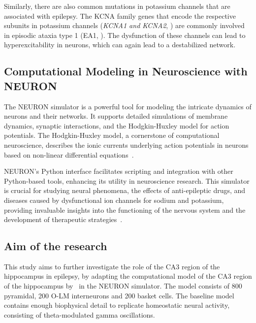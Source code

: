 Similarly, there are also common mutations in potassium channels that are associated with epilepsy.
The KCNA family genes that encode the respective subunits in potassium channels (\textit{KCNA1 and KCNA2}, \textcite{gaoPotassiumChannelsEpilepsy2022})
are commonly involved in episodic ataxia type 1 (EA1, \textcite{gravesIonChannelsEpilepsy2006}).
The dysfunction of these channels can lead to hyperexcitability in neurons, which can again lead to a destabilized network.

 
\subsection{Computational Modeling in Neuroscience with NEURON}
The NEURON simulator is a powerful tool for modeling the intricate dynamics 
of neurons and their networks. It supports detailed simulations of membrane 
dynamics, synaptic interactions, and the Hodgkin-Huxley model for action 
potentials. The Hodgkin-Huxley model, a cornerstone of computational neuroscience,
describes the ionic currents underlying action potentials in neurons based
on non-linear differential equations~\parencite{hodgkinMeasurementCurrentvoltageRelations1952}.

NEURON's Python interface facilitates scripting and integration 
with other Python-based tools, enhancing its utility in neuroscience research.
This simulator is crucial for studying neural phenomena, the effects of 
anti-epileptic drugs, and diseases caused by dysfunctional ion channels for sodium and potassium, 
providing invaluable insights into the functioning of the nervous system 
and the development of therapeutic strategies~\parencite{miglioreParallelNetworkSimulations2006}.

\subsection{Aim of the research}
This study aims to further investigate the role of the CA3 region of the hippocampus in epilepsy, 
by adapting the computational model of the CA3 region of the hippocampus by~\textcite{neymotinKetamineDisruptsTheta2011} in the NEURON simulator.
The model consists of 800 pyramidal, 200 O-LM interneurons and 200 basket cells. 
The baseline model contains enough biophysical detail to replicate homeostatic neural activity, consisting of theta-modulated gamma oscillations.

